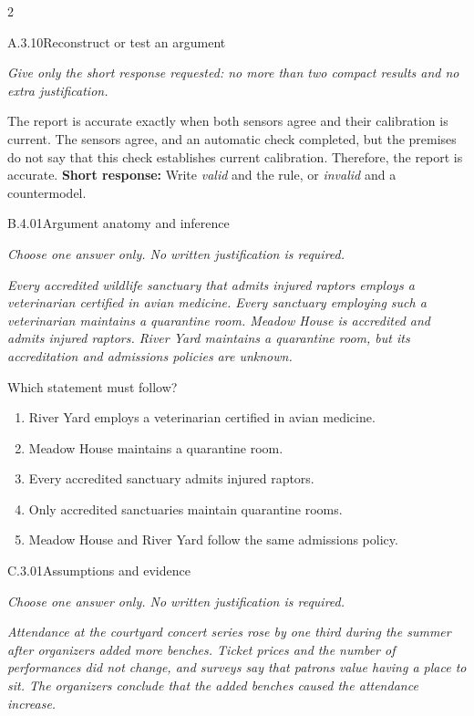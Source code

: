 \documentclass[9pt]{extarticle}
\newcommand{\choice}[1]{\item #1}
\begin{document}
\CoreWorkArea
\FormBreak
{}
\begin{multicols}{2}
\begin{DenseCoreProblem}{A.3.10}{Reconstruct or test an argument}
{\scriptsize\textit{Give only the short response requested: no more than two compact results and no extra justification.}\par}
The report is accurate exactly when both sensors agree and their calibration is current. The sensors agree, and an automatic check completed, but the premises do not say that this check establishes current calibration. Therefore, the report is accurate.
\textbf{Short response:} Write \emph{valid} and the rule, or \emph{invalid} and a countermodel.
\end{DenseCoreProblem}
\begin{DenseCoreProblem}{B.4.01}{Argument anatomy and inference}
{\scriptsize\textit{Choose one answer only. No written justification is required.}\par}
\emph{Every accredited wildlife sanctuary that admits injured raptors employs a veterinarian certified in avian medicine. Every sanctuary employing such a veterinarian maintains a quarantine room. Meadow House is accredited and admits injured raptors. River Yard maintains a quarantine room, but its accreditation and admissions policies are unknown.}

Which statement must follow?
\begin{enumerate}[label=(\alph*)]
  \choice{River Yard employs a veterinarian certified in avian medicine.}
  \choice{Meadow House maintains a quarantine room.}
  \choice{Every accredited sanctuary admits injured raptors.}
  \choice{Only accredited sanctuaries maintain quarantine rooms.}
  \choice{Meadow House and River Yard follow the same admissions policy.}
\end{enumerate}
\end{DenseCoreProblem}
\columnbreak
\begin{DenseCoreProblem}{C.3.01}{Assumptions and evidence}
{\scriptsize\textit{Choose one answer only. No written justification is required.}\par}
\emph{Attendance at the courtyard concert series rose by one third during the summer after organizers added more benches. Ticket prices and the number of performances did not change, and surveys say that patrons value having a place to sit. The organizers conclude that the added benches caused the attendance increase.}


\end{DenseCoreProblem}
\end{multicols}
\end{document}
